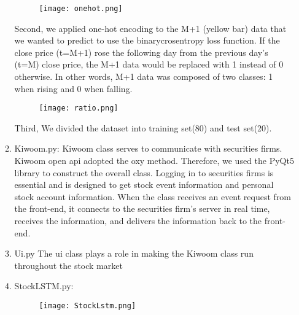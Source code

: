 \documentclass[conference]{IEEEtran}
\begin{document}
\begin{enumerate}
\begin{enumerate}
     \begin{figure}[h]
        \begin{center}
        \centering
        \texttt{[image: onehot.png]}
        \caption{}
        \label{fig:my_label}
        \end{center}
        \end{figure}
    Second, we applied one-hot encoding to the M+1 (yellow bar) data that we wanted to predict to use the binarycrosentropy loss function. If the close price (t=M+1) rose the following day from the previous day's (t=M) close price, the M+1 data would be replaced with 1 instead of 0 otherwise. In other words, M+1 data was composed of two classes: 1 when rising and 0 when falling.\vspace{1\baselineskip}
    
     \begin{figure}[h]
        \begin{center}
        \centering
        \texttt{[image: ratio.png]}
        \caption{}
        \label{fig:my_label}
        \end{center}
        \end{figure}
    
    Third, We divided the dataset into training set(80) and test set(20).
    
    \item Kiwoom.py:
    Kiwoom class serves to communicate with securities firms. Kiwoom open api adopted the oxy method. Therefore, we used the PyQt5 library to construct the overall class. Logging in to securities firms is essential and is designed to get stock event information and personal stock account information. When the class receives an event request from the front-end, it connects to the securities firm's server in real time, receives the information, and delivers the information back to the front-end.\vspace{1\baselineskip}
    
    \item Ui.py
    The ui class plays a role in making the Kiwoom class run throughout the stock market \vspace{1\baselineskip}
    
    \item StockLSTM.py:
    
     \begin{figure}[h]
        \begin{center}
        \centering
        \texttt{[image: StockLstm.png]}
        \caption{}
        \label{fig:my_label}
        \end{center}
        \end{figure}
        

\end{enumerate}
\end{enumerate}
\end{document}
